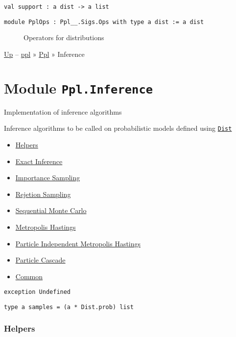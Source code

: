 \protect\hyperlink{val-support}{}\texttt{val\ support\ :\ \textquotesingle{}a\ dist\ -\textgreater{}\ \textquotesingle{}a\ list}

\begin{description}
\item[{\protect\hyperlink{module-PplOps}{}\texttt{module\ PplOps\ :\ Ppl\_\_.Sigs.Ops\ with\ type\ \textquotesingle{}a\ dist\ :=\ \textquotesingle{}a\ dist}}]
Operators for distributions
\end{description}

\href{../index.html}{Up} -- \href{../../index.html}{ppl} »
\href{../index.html}{Ppl} » Inference

\section{\texorpdfstring{Module
\texttt{Ppl.Inference}}{Module Ppl.Inference}}\label{module-ppl.inference}

Implementation of inference algorithms

Inference algorithms to be called on probabilistic models defined using
\href{../Dist/index.html}{\texttt{Dist}}

\begin{itemize}
\tightlist
\item
  \protect\hyperlink{infux5fhelpers}{Helpers}
\item
  \protect\hyperlink{infux5fexact}{Exact Inference}
\item
  \protect\hyperlink{infux5fimp}{Importance Sampling}
\item
  \protect\hyperlink{rejux5fhelpers}{Rejetion Sampling}
\item
  \protect\hyperlink{infux5fsmc}{Sequential Monte Carlo}
\item
  \protect\hyperlink{infux5fmh}{Metropolis Hastings}
\item
  \protect\hyperlink{infux5fpmcmc}{Particle Independent Metropolis
  Hastings}
\item
  \protect\hyperlink{infux5fpc}{Particle Cascade}
\item
  \protect\hyperlink{com}{Common}
\end{itemize}

\protect\hyperlink{exception-Undefined}{}\texttt{exception\ }\texttt{Undefined}

\protect\hyperlink{type-samples}{}\texttt{type\ \textquotesingle{}a\ samples}\texttt{\ =\ (\textquotesingle{}a\ *\ Dist.prob)\ list}

\hypertarget{infux5fhelpers}{\subsubsection{\texorpdfstring{\protect\hyperlink{infux5fhelpers}{}Helpers}{Helpers}}\label{infux5fhelpers}}

